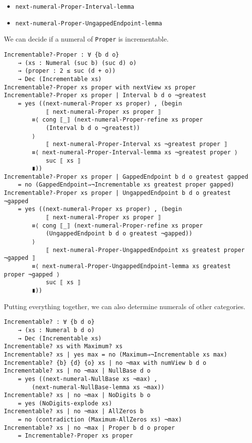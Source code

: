 \documentclass[\main/thesis.tex]{subfiles}
\begin{document}
\begin{itemize}
    \item \lstinline|next-numeral-Proper-Interval-lemma|
    \item \lstinline|next-numeral-Proper-UngappedEndpoint-lemma|
\end{itemize}

We can decide if a numeral of \lstinline|Proper| is incrementable.

\begin{lstlisting}[basicstyle=\ttfamily\scriptsize]
Incrementable?-Proper : ∀ {b d o}
    → (xs : Numeral (suc b) (suc d) o)
    → (proper : 2 ≤ suc (d + o))
    → Dec (Incrementable xs)
Incrementable?-Proper xs proper with nextView xs proper
Incrementable?-Proper xs proper | Interval b d o ¬greatest
    = yes ((next-numeral-Proper xs proper) , (begin
            ⟦ next-numeral-Proper xs proper ⟧
        ≡⟨ cong ⟦_⟧ (next-numeral-Proper-refine xs proper
            (Interval b d o ¬greatest))
        ⟩
            ⟦ next-numeral-Proper-Interval xs ¬greatest proper ⟧
        ≡⟨ next-numeral-Proper-Interval-lemma xs ¬greatest proper ⟩
            suc ⟦ xs ⟧
        ∎))
Incrementable?-Proper xs proper | GappedEndpoint b d o greatest gapped
    = no (GappedEndpoint⇒¬Incrementable xs greatest proper gapped)
Incrementable?-Proper xs proper | UngappedEndpoint b d o greatest ¬gapped
    = yes ((next-numeral-Proper xs proper) , (begin
            ⟦ next-numeral-Proper xs proper ⟧
        ≡⟨ cong ⟦_⟧ (next-numeral-Proper-refine xs proper
            (UngappedEndpoint b d o greatest ¬gapped))
        ⟩
            ⟦ next-numeral-Proper-UngappedEndpoint xs greatest proper ¬gapped ⟧
        ≡⟨ next-numeral-Proper-UngappedEndpoint-lemma xs greatest proper ¬gapped ⟩
            suc ⟦ xs ⟧
        ∎))
\end{lstlisting}


Putting everything together, we can also determine numerals of other categories.

\begin{lstlisting}
Incrementable? : ∀ {b d o}
    → (xs : Numeral b d o)
    → Dec (Incrementable xs)
Incrementable? xs with Maximum? xs
Incrementable? xs | yes max = no (Maximum⇒¬Incrementable xs max)
Incrementable? {b} {d} {o} xs | no ¬max with numView b d o
Incrementable? xs | no ¬max | NullBase d o
    = yes ((next-numeral-NullBase xs ¬max) ,
        (next-numeral-NullBase-lemma xs ¬max))
Incrementable? xs | no ¬max | NoDigits b o
    = yes (NoDigits-explode xs)
Incrementable? xs | no ¬max | AllZeros b
    = no (contradiction (Maximum-AllZeros xs) ¬max)
Incrementable? xs | no ¬max | Proper b d o proper
    = Incrementable?-Proper xs proper
\end{lstlisting}
\end{document}
